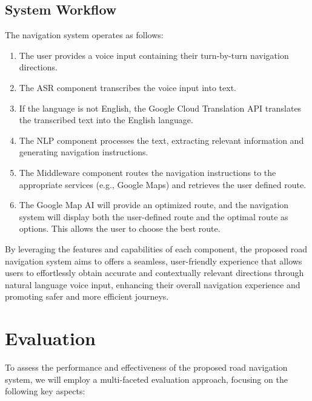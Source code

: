 \documentclass{epsrc}
\begin{document}
\subsection{System Workflow}
The navigation system operates as follows:
\begin{enumerate}
    \item The user provides a voice input containing their turn-by-turn navigation directions.
    \item The ASR component transcribes the voice input into text.
    \item If the language is not English, the Google Cloud Translation API translates the transcribed text into the English language.
    \item The NLP component processes the text, extracting relevant information and generating navigation instructions.
    \item The Middleware component routes the navigation instructions to the appropriate services (e.g., Google Maps) and retrieves the user defined route.
    \item The Google Map AI will provide an optimized route, and the navigation system will display both the user-defined route and the optimal route as options. This allows the user to choose the best route.
\end{enumerate}
By leveraging the features and capabilities of each component, the proposed road navigation system aims to offers a seamless, user-friendly experience that allows users to effortlessly obtain accurate and contextually relevant directions through natural language voice input, enhancing their overall navigation experience and promoting safer and more efficient journeys.
\vspace{5pt}

\section{Evaluation}
\vspace{5pt}

To assess the performance and effectiveness of the proposed road navigation system, we will employ a multi-faceted evaluation approach, focusing on the following key aspects:
\end{document}
